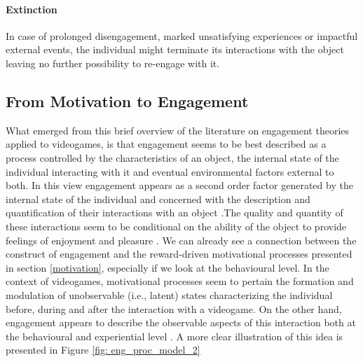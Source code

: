 \paragraph*{Extinction} In case of prolonged disengagement, marked unsatisfying experiences or impactful external events, the individual might terminate its interactions with the object leaving no further possibility to re-engage with it.

\subsection{From Motivation to Engagement}
\label{eng_reward_motivation}
What emerged from this brief overview of the literature on engagement theories applied to videogames, is that engagement seems to be best described as a process controlled by the characteristics of an object, the internal state of the individual interacting with it and eventual environmental factors external to both. In this view engagement appears as a second order factor generated by the internal state of the individual and concerned with the description and quantification of their interactions with an object  \cite{lucas2004sex,o2008user,jennett2008measuring,boyle2012engagement,connolly2012systematic,csikszentmihalyi2014toward}.The quality and quantity of these interactions seem to be conditional on the ability of the object to provide feelings of enjoyment and pleasure \cite{lucas2004sex,o2008user,jennett2008measuring,boyle2012engagement,connolly2012systematic,csikszentmihalyi2014toward}. We can already see a connection between the construct of engagement and the reward-driven motivational processes presented in section \ref{motivation}, especially if we look at the behavioural level. In the context of videogames, motivational processes seem to pertain the formation and modulation of unobservable (i.e., latent) states characterizing the individual before, during and after the interaction with a videogame. On the other hand, engagement appears to describe the observable aspects of this interaction both at the behavioural and experiential level \cite{lucas2004sex,o2008user,jennett2008measuring,boyle2012engagement,connolly2012systematic,csikszentmihalyi2014toward}. A more clear illustration of this idea is presented in Figure \ref{fig: eng_proc_model_2} 

